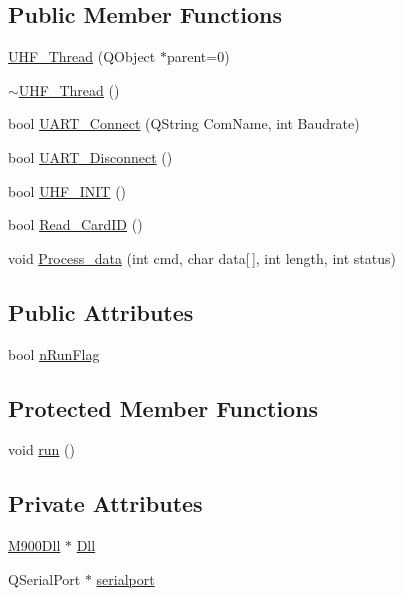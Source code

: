 \subsection*{Public Member Functions}
\begin{DoxyCompactItemize}
\item 
\mbox{\hyperlink{class_u_h_f___thread_a4e345d08f3f78642458925017371cac2}{U\+H\+F\+\_\+\+Thread}} (Q\+Object $\ast$parent=0)
\item 
\mbox{\hyperlink{class_u_h_f___thread_a884aee3bdd34d43aa21af0ebe0012e7b}{$\sim$\+U\+H\+F\+\_\+\+Thread}} ()
\item 
bool \mbox{\hyperlink{class_u_h_f___thread_a8a872370902a9eb489a836ab28d8044c}{U\+A\+R\+T\+\_\+\+Connect}} (Q\+String Com\+Name, int Baudrate)
\item 
bool \mbox{\hyperlink{class_u_h_f___thread_a4d29770cacd38ec97148b8642df794b8}{U\+A\+R\+T\+\_\+\+Disconnect}} ()
\item 
bool \mbox{\hyperlink{class_u_h_f___thread_a8fc7d9ed28c737bc95cc33fc780b8bc2}{U\+H\+F\+\_\+\+I\+N\+IT}} ()
\item 
bool \mbox{\hyperlink{class_u_h_f___thread_a5c1a49f76f8e3a29fb009b7d638e5488}{Read\+\_\+\+Card\+ID}} ()
\item 
void \mbox{\hyperlink{class_u_h_f___thread_a5e287beadcbcccffcd5859fa25263785}{Process\+\_\+data}} (int cmd, char data\mbox{[}$\,$\mbox{]}, int length, int status)
\end{DoxyCompactItemize}
\subsection*{Public Attributes}
\begin{DoxyCompactItemize}
\item 
bool \mbox{\hyperlink{class_u_h_f___thread_ab40811b93c5e8b31c4f40cc79139e504}{n\+Run\+Flag}}
\end{DoxyCompactItemize}
\subsection*{Protected Member Functions}
\begin{DoxyCompactItemize}
\item 
void \mbox{\hyperlink{class_u_h_f___thread_a7ae2a5c0bae9b20e0fbc315febefb818}{run}} ()
\end{DoxyCompactItemize}
\subsection*{Private Attributes}
\begin{DoxyCompactItemize}
\item 
\mbox{\hyperlink{class_m900_dll}{M900\+Dll}} $\ast$ \mbox{\hyperlink{class_u_h_f___thread_aca70040f175e3e6140b6b19c4b84b42b}{Dll}}
\item 
Q\+Serial\+Port $\ast$ \mbox{\hyperlink{class_u_h_f___thread_a20904e9764b311fdb015c3fd6cbec497}{serialport}}
\end{DoxyCompactItemize}


